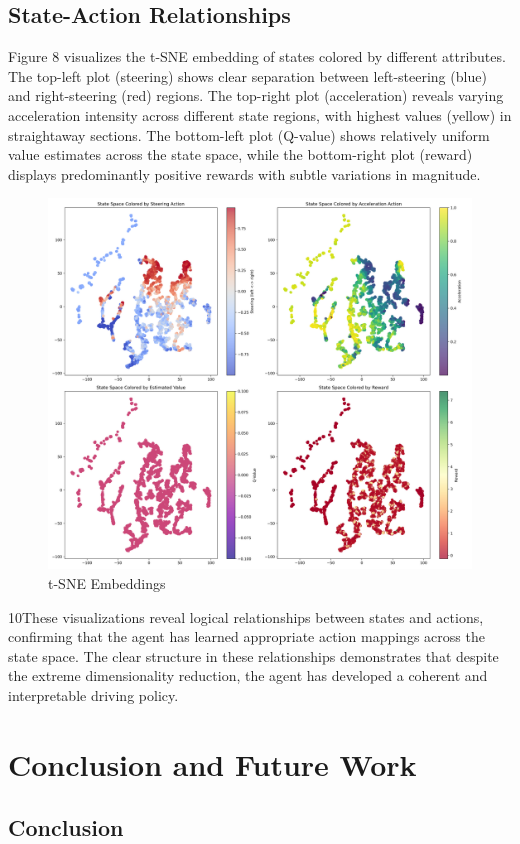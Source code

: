 \documentclass[conference]{IEEEtran}
\begin{document}
\subsection{State-Action Relationships}
Figure 8 visualizes the t-SNE embedding of states colored by different attributes. The top-left plot (steering) shows clear separation between left-steering (blue) and right-steering (red) regions. The top-right plot (acceleration) reveals varying acceleration intensity across different state regions, with highest values (yellow) in straightaway sections. The bottom-left plot (Q-value) shows relatively uniform value estimates across the state space, while the bottom-right plot (reward) displays predominantly positive rewards with subtle variations in magnitude.
\begin{figure}[H]
    \centering
    \includegraphics[width=0.75\linewidth]{Writeup/tsne.png}
    \caption{t-SNE Embeddings}
    \label{fig:enter-label}
\end{figure}

10These visualizations reveal logical relationships between states and actions, confirming that the agent has learned appropriate action mappings across the state space. The clear structure in these relationships demonstrates that despite the extreme dimensionality reduction, the agent has developed a coherent and interpretable driving policy.
\section{Conclusion and Future Work}

\subsection{Conclusion}
\end{document}
